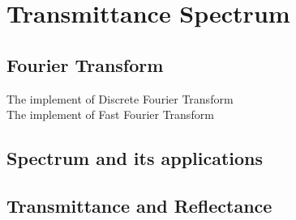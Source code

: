 \section{Transmittance Spectrum}
\subsection{Fourier Transform}
The implement of Discrete Fourier Transform\\
The implement of Fast Fourier Transform
\subsection{Spectrum and its applications}
\subsection{Transmittance and Reflectance}

